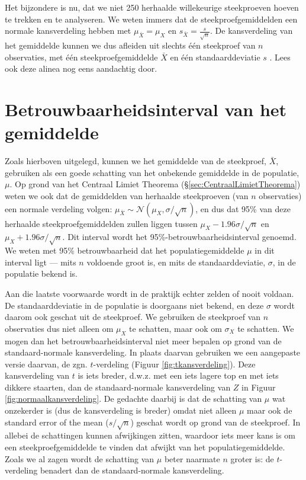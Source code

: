 \documentclass[
]{book}
\begin{document}
Het bijzondere is nu, dat we niet 250 herhaalde willekeurige
steekproeven hoeven te trekken en te analyseren. We weten immers dat de
steekproefgemiddelden een normale kansverdeling hebben met
\(\mu_{\bar{X}} = \mu_X\) en \(s_{\bar{X}} = \frac{s}{\sqrt{n}}\). De
kansverdeling van het gemiddelde kunnen we dus afleiden uit slechts één
steekproef van \(n\) observaties, met één steekproefgemiddelde \(\bar{X}\)
en één standaarddeviatie \(s\) \citep{Cumm12}. Lees ook deze alinea nog eens
aandachtig door.

\hypertarget{sec:betrouwbaarheidsinterval-gemiddelde}{%
\section{Betrouwbaarheidsinterval van het gemiddelde}\label{sec:betrouwbaarheidsinterval-gemiddelde}}

Zoals hierboven uitgelegd, kunnen we het gemiddelde van de steekproef,
\(\bar{X}\), gebruiken als een goede schatting van het onbekende
gemiddelde in de populatie, \(\mu\). Op grond van het Centraal Limiet
Theorema (§\ref{sec:CentraalLimietTheorema}) weten we ook dat de gemiddelden
van herhaalde steekproeven (van \(n\) observaties) een normale verdeling
volgen: \(\mu_{\bar{X}} \sim \mathcal{N}(\mu_{X},\sigma/\sqrt{n})\), en
dus dat 95\% van deze herhaalde steekproefgemiddelden zullen liggen
tussen \(\mu_{X}-1.96\sigma/\sqrt{n}\) en \(\mu_{X}+1.96\sigma/\sqrt{n}\).
Dit interval wordt het 95\%-betrouwbaarheidsinterval genoemd. We weten
met 95\% betrouwbaarheid dat het populatiegemiddelde \(\mu\) in dit
interval ligt --- mits \(n\) voldoende groot is, en mits de
standaarddeviatie, \(\sigma\), in de populatie bekend is.

Aan die laatste voorwaarde wordt in de praktijk echter zelden of nooit
voldaan. De standaarddeviatie in de populatie is doorgaans niet bekend,
en deze \(\sigma\) wordt daarom ook geschat uit de steekproef. We
gebruiken de steekproef van \(n\) observaties dus niet alleen om \(\mu_X\)
te schatten, maar ook om \(\sigma_X\) te schatten. We mogen dan het
betrouwbaarheidsinterval niet meer bepalen op grond van de
standaard-normale kansverdeling. In plaats daarvan gebruiken we een
aangepaste versie daarvan, de zgn. \(t\)-verdeling
(Figuur \ref{fig:tkansverdeling}). Deze kansverdeling van \(t\) is iets
breder, d.w.z. met een iets lagere top en met iets dikkere staarten, dan
de standaard-normale kansverdeling van \(Z\) in
Figuur \ref{fig:normaalkansverdeling}.
De gedachte daarbij is dat de
schatting van \(\mu\) wat onzekerder is (dus de kansverdeling is breder)
omdat niet alleen \(\mu\) maar ook de standard error of the mean
(\(s/\sqrt{n}\)) geschat wordt op grond van de steekproef. In allebei de
schattingen kunnen afwijkingen zitten, waardoor iets meer kans is om een
steekproefgemiddelde te vinden dat afwijkt van het populatiegemiddelde.
Zoals we al zagen wordt de schatting van \(\mu\) beter naarmate \(n\) groter
is: de \(t\)-verdeling benadert dan de standaard-normale kansverdeling.
\end{document}
